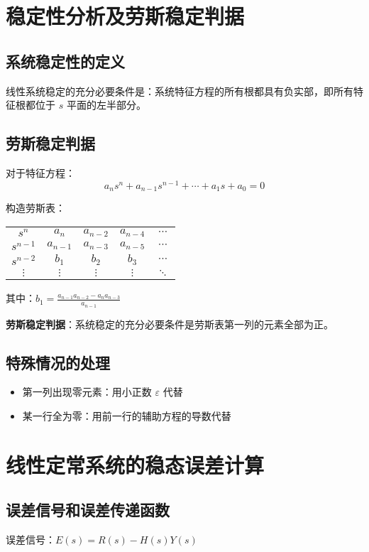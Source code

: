 \documentclass[12pt,a4paper]{article}
\begin{document}
\section{稳定性分析及劳斯稳定判据}

\subsection{系统稳定性的定义}
线性系统稳定的充分必要条件是：系统特征方程的所有根都具有负实部，即所有特征根都位于 $s$ 平面的左半部分。

\subsection{劳斯稳定判据}
对于特征方程：
\[a_n s^n + a_{n-1}s^{n-1} + \cdots + a_1 s + a_0 = 0\]

构造劳斯表：
\begin{center}
\begin{tabular}{c|cccc}
$s^n$ & $a_n$ & $a_{n-2}$ & $a_{n-4}$ & $\cdots$ \\
$s^{n-1}$ & $a_{n-1}$ & $a_{n-3}$ & $a_{n-5}$ & $\cdots$ \\
$s^{n-2}$ & $b_1$ & $b_2$ & $b_3$ & $\cdots$ \\
$\vdots$ & $\vdots$ & $\vdots$ & $\vdots$ & $\ddots$ \\
\end{tabular}
\end{center}

其中：$b_1 = \frac{a_{n-1}a_{n-2} - a_n a_{n-3}}{a_{n-1}}$

\textbf{劳斯稳定判据}：系统稳定的充分必要条件是劳斯表第一列的元素全部为正。

\subsection{特殊情况的处理}
\begin{itemize}
    \item 第一列出现零元素：用小正数 $\varepsilon$ 代替
    \item 某一行全为零：用前一行的辅助方程的导数代替
\end{itemize}

\section{线性定常系统的稳态误差计算}

\subsection{误差信号和误差传递函数}
误差信号：$E(s) = R(s) - H(s)Y(s)$
\end{document}
